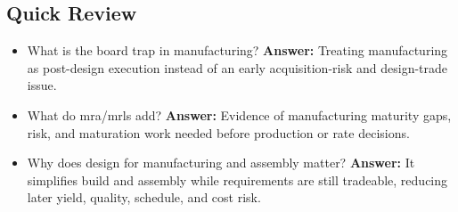 \documentclass[../main.tex]{subfiles}
\begin{document}
\subsection{Quick Review}
\begin{itemize}
  \item What is the board trap in manufacturing? \textbf{Answer:} Treating manufacturing as post-design execution instead of an early acquisition-risk and design-trade issue.
  \item What do \ac{mra}/\acp{mrl} add? \textbf{Answer:} Evidence of manufacturing maturity gaps, risk, and maturation work needed before production or rate decisions.
  \item Why does design for manufacturing and assembly matter? \textbf{Answer:} It simplifies build and assembly while requirements are still tradeable, reducing later yield, quality, schedule, and cost risk.
\end{itemize}

\end{document}
